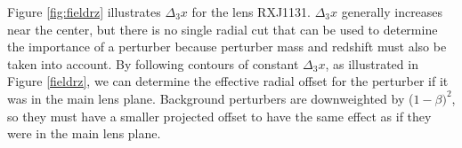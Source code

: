 Figure \ref{fig:fieldrz} illustrates $\Delta_3 x$ for the lens RXJ1131. $\Delta_3 x$ generally increases near the center, but there is no single radial cut that can be used to determine the importance of a perturber because perturber mass and redshift must also be taken into account. By following contours of constant $\Delta_3 x$, as illustrated in Figure \ref{fieldrz}, we can determine the effective radial offset for the perturber if it was in the main lens plane. Background perturbers are downweighted by ($1-\beta)^2$, so they must have a smaller projected offset to have the same effect as if they were in the main lens plane.
  
  